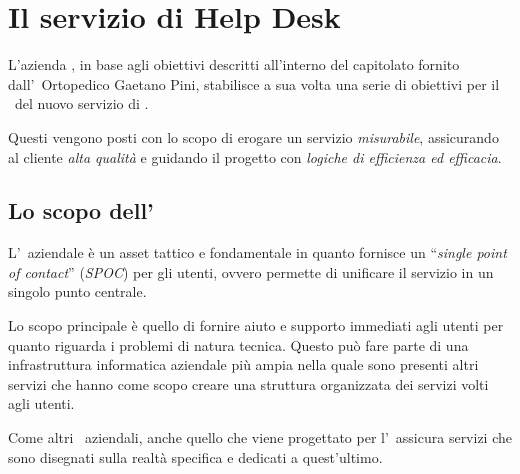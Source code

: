 \chapter{Il servizio di Help Desk}\label{ch:servizio_helpdesk}

	L'azienda \azienda, in base agli obiettivi descritti all'interno del capitolato fornito dall'\istituto~Ortopedico Gaetano Pini, stabilisce a sua volta una serie di obiettivi per il \rollout~del nuovo servizio di \helpdesk.
	
	Questi vengono posti con lo scopo di erogare un servizio \textit{misurabile}, assicurando al cliente \textit{alta qualità} e guidando il progetto con \textit{logiche di efficienza ed efficacia}.
	
\section{Lo scopo dell'\helpdesk}\label{sec:scopo_helpdesk}
	
	L'\helpdesk~aziendale è un asset tattico e fondamentale in quanto fornisce un ``\textit{single point of contact}'' (\textit{SPOC}) per gli utenti, ovvero permette di unificare il servizio in un singolo punto centrale.

	Lo scopo principale è quello di fornire aiuto e supporto immediati agli utenti per quanto riguarda i problemi di natura tecnica.
	Questo può fare parte di una infrastruttura informatica aziendale più ampia nella quale sono presenti altri servizi che hanno come scopo creare una struttura organizzata dei servizi volti agli utenti.
	
	Come altri \helpdesk~aziendali, anche quello che viene progettato per l'\istituto~assicura servizi che sono disegnati sulla realtà specifica e dedicati a quest'ultimo.
	
